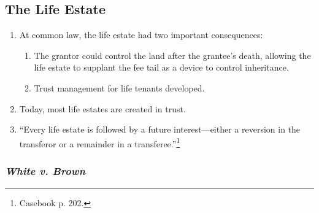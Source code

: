 \subsection{The Life Estate}

\begin{enumerate}
    \item At common law, the life estate had two important consequences:
    \begin{enumerate}
        \item The grantor could control the land after the grantee's death, 
        allowing the life estate to supplant the fee tail as a device to 
        control inheritance.
        \item Trust management for life tenants developed.
    \end{enumerate}
    \item Today, most life estates are created in trust.
    \item ``Every life estate is followed by a future interest---either a 
    reversion in the transferor or a remainder in a 
    transferee.''\footnote{Casebook p. 202.}
\end{enumerate}

\subsubsection{\emph{White v. Brown}}

